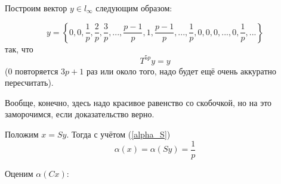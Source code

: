 Построим вектор $y\in l_\infty$ следующим образом:

\begin{equation}\label{y_construction}
	y = \left\{
		0, 0, \frac{1}{p}, \frac{2}{p}, \frac{3}{p},
		...,
		\frac{p-1}{p}, 1, \frac{p-1}{p},
		...,
		\frac{1}{p},
		0, 0, 0, ..., 0,
		\frac{1}{p}, ...
	\right\}
\end{equation}
так, что
\begin{equation}\label{T_y}
	T^{5p}y = y
\end{equation}
(0 повторяется $3p+1$ раз или около того, надо будет ещё очень аккуратно пересчитать).

Вообще, конечно, здесь надо красивое равенство со скобочкой, но на это заморочимся,
если доказательство верно.

Положим $x = Sy$.
Тогда с учётом (\ref{alpha_S})
\begin{equation}\label{alpha_x}
	\alpha (x) = \alpha (Sy) = \frac{1}{p}
\end{equation}


Оценим $\alpha(Cx)$:

